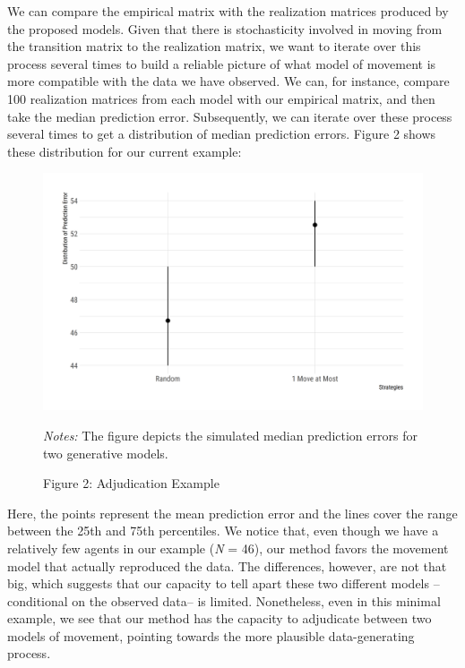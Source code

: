 \documentclass[
  11pt,
]{article}
\begin{document}
We can compare the empirical matrix with the realization matrices
produced by the proposed models. Given that there is stochasticity
involved in moving from the transition matrix to the realization matrix,
we want to iterate over this process several times to build a reliable
picture of what model of movement is more compatible with the data we
have observed. We can, for instance, compare 100 realization matrices
from each model with our empirical matrix, and then take the median
prediction error. Subsequently, we can iterate over these process
several times to get a distribution of median prediction errors. Figure
2 shows these distribution for our current example:

\begin{figure}[htp]
\begin{center}
\caption*{Figure 2: Adjudication Example}

\begin{center}\includegraphics[width=1\linewidth]{../figures/figure_2} \end{center}

\end{center}
\footnotesize{\textit{Notes:} The figure depicts the simulated median prediction errors for two generative models.}
\end{figure}

Here, the points represent the mean prediction error and the lines cover
the range between the 25th and 75th percentiles. We notice that, even
though we have a relatively few agents in our example (\emph{N} = 46),
our method favors the movement model that actually reproduced the data.
The differences, however, are not that big, which suggests that our
capacity to tell apart these two different models --conditional on the
observed data-- is limited. Nonetheless, even in this minimal example,
we see that our method has the capacity to adjudicate between two models
of movement, pointing towards the more plausible data-generating
process.
\end{document}
